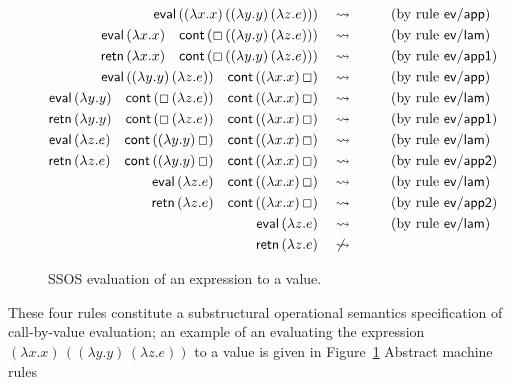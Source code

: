 \begin{figure}
\begin{align*}
{\sf eval}\,((\lambda x.x)\,((\lambda y.y)\,(\lambda z.e))) 
& ~~~\rightsquigarrow~~ \tag{by rule ${\sf ev/app}$}\\
{\sf eval}\,(\lambda x.x) \quad
{\sf cont}\,(\Box\,((\lambda y.y)\,(\lambda z.e)))
& ~~~\rightsquigarrow~~ \tag{by rule ${\sf ev/lam}$}\\
{\sf retn}\,(\lambda x.x) \quad
{\sf cont}\,(\Box\,((\lambda y.y)\,(\lambda z.e)))
& ~~~\rightsquigarrow~~ \tag{by rule ${\sf ev/app1}$}\\
{\sf eval}\,((\lambda y.y)\,(\lambda z.e)) \quad
{\sf cont}\,((\lambda x.x)\,\Box)
& ~~~\rightsquigarrow~~ \tag{by rule ${\sf ev/app}$}\\
{\sf eval}\,(\lambda y.y) \quad
{\sf cont}\,(\Box\,(\lambda z.e)) \quad
{\sf cont}\,((\lambda x.x)\,\Box)
& ~~~\rightsquigarrow~~ \tag{by rule ${\sf ev/lam}$}\\
{\sf retn}\,(\lambda y.y) \quad
{\sf cont}\,(\Box\,(\lambda z.e)) \quad
{\sf cont}\,((\lambda x.x)\,\Box)
& ~~~\rightsquigarrow~~ \tag{by rule ${\sf ev/app1}$}\\
{\sf eval}\,(\lambda z.e) \quad
{\sf cont}\,((\lambda y.y)\,\Box) \quad
{\sf cont}\,((\lambda x.x)\,\Box)
& ~~~\rightsquigarrow~~ \tag{by rule ${\sf ev/lam}$}\\
{\sf retn}\,(\lambda z.e) \quad
{\sf cont}\,((\lambda y.y)\,\Box) \quad
{\sf cont}\,((\lambda x.x)\,\Box)
& ~~~\rightsquigarrow~~ \tag{by rule ${\sf ev/app2}$}\\
{\sf eval}\,(\lambda z.e) \quad
{\sf cont}\,((\lambda x.x)\,\Box)
& ~~~\rightsquigarrow~~ \tag{by rule ${\sf ev/lam}$}\\
{\sf retn}\,(\lambda z.e) \quad
{\sf cont}\,((\lambda x.x)\,\Box)
& ~~~\rightsquigarrow~~ \tag{by rule ${\sf ev/app2}$}\\
{\sf eval}\,(\lambda z.e) 
& ~~~\rightsquigarrow~~ \tag{by rule ${\sf ev/lam}$}\\
{\sf retn}\,(\lambda z.e) 
& ~~~\not\rightsquigarrow~~ 
\end{align*}
\caption{SSOS evaluation of an expression to a value.}
\label{fig:ssos-example}
\end{figure}

These four rules constitute a substructural operational semantics 
specification of call-by-value evaluation; an example of an evaluating
the expression $(\lambda x.x)\,((\lambda y.y)\,(\lambda z.e))$ to a value
is given in Figure~\ref{fig:ssos-example}
Abstract machine rules

